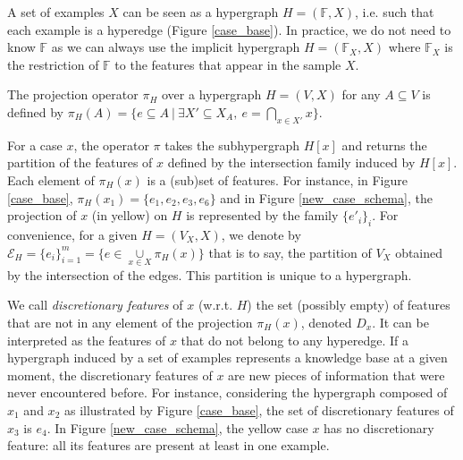 \documentclass[sigconf,edbt]{acmart-edbt-workshops}
\begin{document}
A set of examples $X$ can be seen as a hypergraph $H = (\mathbb F, X)$, i.e. such that each example is a hyperedge (Figure \ref{case_base}). In practice, we do not need to know $\mathbb{F}$ as we can always use the implicit hypergraph $H = (\mathbb{F}_X, X)$ where $\mathbb{F}_X$ is the restriction of $\mathbb{F}$ to the features that appear in the sample $X$.
\begin{definition}
The projection operator $\pi_H$ over a hypergraph $H = (V, X)$ for any $A \subseteq V$ is defined by $\pi_H(A) = \{ e \subseteq A ~ | ~ \exists X' \subseteq X_A, ~ e = \underset{x \in X'}{\bigcap} x \}$.
\end{definition}
For a case $x$, the operator $\pi$ takes the subhypergraph $H[x]$ and returns the partition of the features of $x$ defined by the intersection family induced by $H[x]$. Each element of $\pi_H(x)$ is a (sub)set of features. For instance, in Figure \ref{case_base}, $\pi_H(x_1) = \{ e_1, e_2, e_3, e_6 \}$ and in Figure \ref{new_case_schema}, the projection of $x$ (in yellow) on $H$ is represented by the family $\{ e'_i\}_i$.
For convenience, for a given $H = (V_X, X)$, we denote by $\mathcal{E}_H = \{e_i\}^m_{i=1} = \{ e \in \underset{x \in X}{\cup} \pi_H(x)\}$ that is to say, the partition of $V_X$ obtained by the intersection of the edges. This partition is unique to a hypergraph.

We call {\it discretionary features} of $x$ (w.r.t. $H$) the set (possibly empty) of features that are not in any element of the projection $\pi_H(x)$, denoted $D_x$. It can be interpreted as the features of $x$ that do not belong to any hyperedge. If a hypergraph induced by a set of examples represents a knowledge base at a given moment, the discretionary features of $x$ are new pieces of information that were never encountered before. For instance, considering the hypergraph composed of $x_1$ and $x_2$ as illustrated by Figure \ref{case_base}, the set of discretionary features of $x_3$ is $e_4$. In Figure \ref{new_case_schema}, the yellow case $x$ has no discretionary feature: all its features are present at least in one example.
\end{document}
